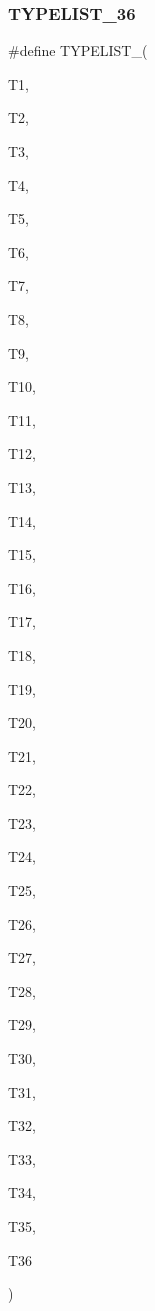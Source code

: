 \subsubsection{\texorpdfstring{TYPELIST\_36}{TYPELIST\_36}}
{\footnotesize\ttfamily \#define T\+Y\+P\+E\+L\+I\+S\+T\+\_(\begin{DoxyParamCaption}\item[{}]{T1,  }\item[{}]{T2,  }\item[{}]{T3,  }\item[{}]{T4,  }\item[{}]{T5,  }\item[{}]{T6,  }\item[{}]{T7,  }\item[{}]{T8,  }\item[{}]{T9,  }\item[{}]{T10,  }\item[{}]{T11,  }\item[{}]{T12,  }\item[{}]{T13,  }\item[{}]{T14,  }\item[{}]{T15,  }\item[{}]{T16,  }\item[{}]{T17,  }\item[{}]{T18,  }\item[{}]{T19,  }\item[{}]{T20,  }\item[{}]{T21,  }\item[{}]{T22,  }\item[{}]{T23,  }\item[{}]{T24,  }\item[{}]{T25,  }\item[{}]{T26,  }\item[{}]{T27,  }\item[{}]{T28,  }\item[{}]{T29,  }\item[{}]{T30,  }\item[{}]{T31,  }\item[{}]{T32,  }\item[{}]{T33,  }\item[{}]{T34,  }\item[{}]{T35,  }\item[{}]{T36 }\end{DoxyParamCaption})}

